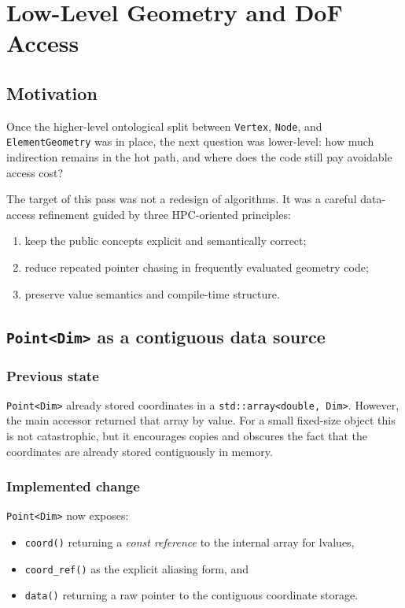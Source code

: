 \chapter{Low-Level Geometry and DoF Access}

\section{Motivation}

Once the higher-level ontological split between \texttt{Vertex}, \texttt{Node},
and \texttt{ElementGeometry} was in place, the next question was lower-level:
how much indirection remains in the hot path, and where does the code still pay
avoidable access cost?

The target of this pass was not a redesign of algorithms.  It was a careful
data-access refinement guided by three HPC-oriented principles:
\begin{enumerate}[nosep]
  \item keep the public concepts explicit and semantically correct;
  \item reduce repeated pointer chasing in frequently evaluated geometry code;
  \item preserve value semantics and compile-time structure.
\end{enumerate}

\section{\texttt{Point<Dim>} as a contiguous data source}

\subsection{Previous state}

\texttt{Point<Dim>} already stored coordinates in a
\texttt{std::array<double, Dim>}.  However, the main accessor returned that
array by value.  For a small fixed-size object this is not catastrophic, but it
encourages copies and obscures the fact that the coordinates are already stored
contiguously in memory.

\subsection{Implemented change}

\texttt{Point<Dim>} now exposes:
\begin{itemize}[nosep]
  \item \texttt{coord()} returning a \emph{const reference} to the internal
        array for lvalues,
  \item \texttt{coord\_ref()} as the explicit aliasing form, and
  \item \texttt{data()} returning a raw pointer to the contiguous coordinate
        storage.
\end{itemize}

